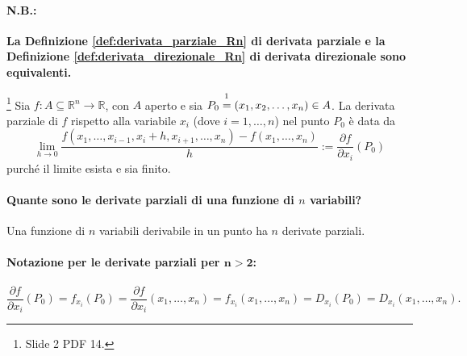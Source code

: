 
\paragraph{N.B.:} \textbf{La Definizione \ref{def:derivata_parziale_Rn} di derivata parziale e la Definizione \ref{def:derivata_direzionale_Rn} di derivata direzionale sono equivalenti.}

\begin{definition}\label{def:derivata_parziale_Rn}\footnote{Slide 2 PDF 14.}
    Sia $f:A\subseteq\mathbb R^n\rightarrow\mathbb R$, con $A$ aperto e sia $P_0\overset{\footnotemark}{=}(x_1,x_2,\hdots, x_n)\in A$. La derivata parziale di $f$ rispetto alla variabile $x_i$ (dove $i=1,\hdots, n$) nel punto $P_0$ è data da
    \begin{equation}\label{eq:derivata_parziale_Rn}
        \lim\limits_{h\rightarrow 0}\frac{f(x_1,\hdots,x_{i-1},x_i+h,x_{i+1},\hdots,  x_n)-f(x_1,\hdots, x_n)}{h}:=\frac{\partial f}{\partial x_i}(P_0)
    \end{equation}
    purché il limite esista e sia finito.
\end{definition}

\paragraph{Quante sono le derivate parziali di una funzione di $n$ variabili?} Una funzione di $n$ variabili derivabile in un punto ha $n$ derivate parziali.

\paragraph{Notazione per le derivate parziali per $\boldsymbol{n>2}$:}
\begin{equation*}
    \frac{\partial f}{\partial x_i}(P_0)=f_{x_i}(P_0)=\frac{\partial f}{\partial x_i}(x_1,\hdots,x_n)=f_{x_i}(x_1,\hdots,x_n)=  D_{x_i}(P_0)=D_{x_i}(x_1,\hdots,x_n).
\end{equation*}

